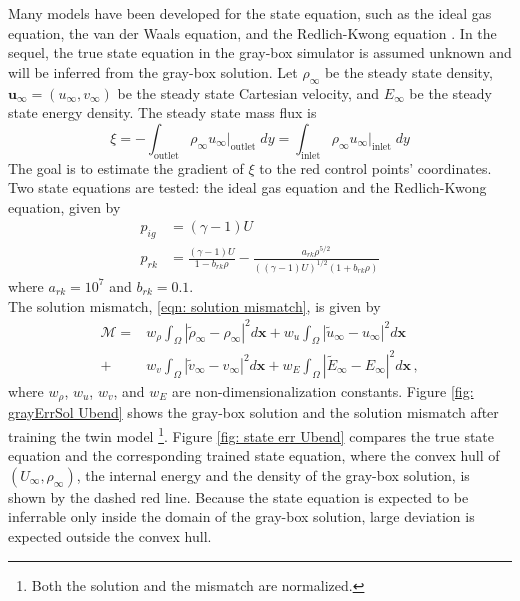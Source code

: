 Many models have been developed for the state equation, such as the ideal gas equation, the
van der Waals equation, and the Redlich-Kwong equation \cite{state eqns}.
In the sequel, the true state equation in the gray-box simulator is assumed unknown and
will be inferred from the gray-box solution. 
Let $\rho_\infty$ be the steady state density,
$\boldsymbol{u}_\infty = (u_\infty, v_\infty)$ be the steady state Cartesian velocity,
and $E_\infty$ be the steady state energy density.
The steady state mass flux is
\begin{equation}
    \xi = - \int_{\textrm{outlet}} \rho_\infty u_\infty \big|_{\textrm{outlet}} \; dy=
    \int_{\textrm{inlet}} \rho_\infty u_\infty\big|_{\textrm{inlet}} \; dy
    \label{eqn: mass flux}
\end{equation}
The goal is to estimate the gradient of $\xi$
to the red control points' coordinates.
\\

Two state equations are tested: the ideal gas equation and the Redlich-Kwong equation, 
given by
\begin{equation}\begin{split}
    p_{ig} &= (\gamma-1) U\\
    p_{rk} &= \frac{(\gamma-1)U}{1-b_{rk}\rho} - 
    \frac{a_{rk}\rho^{5/2}}{((\gamma-1)U)^{1/2}(1+b_{rk}\rho)}
\end{split}\label{NS state equations}
\end{equation}
where $a_{rk}=10^7$ and $b_{rk}=0.1$.\\

The solution mismatch, \eqref{eqn: solution mismatch}, is given by
\begin{equation*}\begin{split}
    \mathcal{M} = &w_\rho \int_\Omega \left|\tilde{\rho}_{\infty} - \rho_{\infty}\right|^2 d\boldsymbol{x}
                + w_u
                \int_\Omega \left|\tilde{u}_{\infty}- u_{\infty}\right|^2 d\boldsymbol{x} \\
                + &w_v
                \int_\Omega \left| \tilde{v}_{\infty}- v_{\infty}\right|^2 d\boldsymbol{x}
                + w_E
                \int_\Omega \left|\tilde{E}_{\infty} - E_\infty\right|^2 d\boldsymbol{x}\,,
    \label{NS mismatch}
\end{split}\end{equation*}
where $w_\rho$, $w_u$, $w_v$, and $w_E$ are non-dimensionalization constants.
Figure \ref{fig: grayErrSol Ubend} shows the gray-box solution and the solution mismatch
after training the twin model \footnote{Both the solution and the mismatch are normalized.}.
Figure \ref{fig: state err Ubend} compares the true state equation and the corresponding trained 
state equation, where the convex hull of $({U}_\infty, \rho_\infty)$, the internal energy
and the density of the gray-box solution,
is shown by the dashed red line.
Because the state equation is expected to be inferrable only inside the domain of the gray-box 
solution, large deviation is expected outside the convex hull.\\

